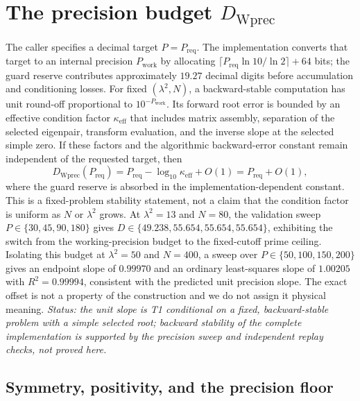 \documentclass[11pt,a4paper]{article}
\begin{document}
\section{The precision budget $D_{\mathrm{Wprec}}$}\label{sec:wprec}

The caller specifies a decimal target $P=P_{\mathrm{req}}$. The implementation
converts that target to an internal precision $P_{\mathrm{work}}$ by allocating
$\lceil P_{\mathrm{req}}\ln10/\ln2\rceil+64$ bits; the guard reserve contributes
approximately $19.27$ decimal digits before accumulation and conditioning
losses. For fixed $(\lambda^2,N)$, a backward-stable computation has unit
round-off proportional to $10^{-P_{\mathrm{work}}}$. Its forward root error is
bounded by an effective condition factor $\kappa_{\mathrm{eff}}$ that includes
matrix assembly, separation of the selected eigenpair, transform evaluation,
and the inverse slope at the selected simple zero. If these factors and the
algorithmic backward-error constant remain independent of the requested target,
then
\begin{equation}\label{eq:wprec}
  D_{\mathrm{Wprec}}(P_{\mathrm{req}})
  =P_{\mathrm{req}}-\log_{10}\kappa_{\mathrm{eff}}+O(1)
  =P_{\mathrm{req}}+O(1),
\end{equation}
where the guard reserve is absorbed in the implementation-dependent constant.
This is a fixed-problem stability statement, not a claim that the condition
factor is uniform as $N$ or $\lambda^2$ grows. At $\lambda^2=13$ and
$N=80$, the validation sweep $P\in\{30,45,90,180\}$ gives
$D\in\{49.238,55.654,55.654,55.654\}$, exhibiting the switch from the
working-precision budget to the fixed-cutoff prime ceiling. Isolating
this budget at $\lambda^2=50$ and $N=400$, a sweep over
$P\in\{50,100,150,200\}$ gives an endpoint slope of $0.99970$ and an ordinary
least-squares slope of $1.00205$ with $R^2=0.99994$, consistent with the
predicted unit precision slope. The exact
offset is not a property of the construction and we do not assign it physical
meaning. \emph{Status: the unit slope is T1 conditional on a fixed,
backward-stable problem with a simple selected root; backward stability of the
complete implementation is supported by the precision sweep and independent
replay checks, not proved here.}

\subsection{Symmetry, positivity, and the precision floor}\label{ssec:evenness}
\end{document}
